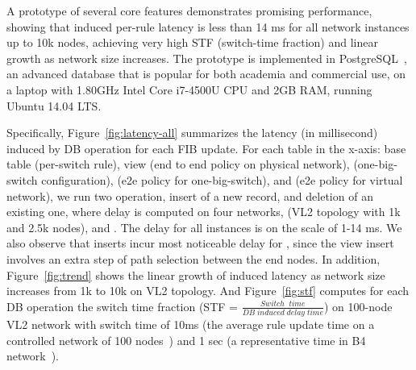 A prototype of several core features \TI demonstrates promising
performance, showing that \Sys induced per-rule latency is less than
14 ms for all network instances up to 10k nodes, achieving very high
STF (switch-time fraction) and linear growth as network size
increases. The prototype is implemented in PostgreSQL~\cite{postgres},
an advanced database that is popular for both academia and commercial
use, on a laptop with 1.80GHz Intel Core i7-4500U CPU and 2GB RAM,
running Ubuntu 14.04 LTS.

Specifically, Figure~\ref{fig:latency-all} summarizes the latency (in
millisecond) induced by DB operation for each FIB update.  For each
table in the x-axis: base table  (per-switch rule), view
 (end to end policy on physical network), 
(one-big-switch configuration),  (e2e policy for
one-big-switch), and  (e2e policy for virtual network), we
run two operation, insert of a new record, and deletion of an existing
one, where delay is computed on four networks,  (VL2
topology with 1k and 2.5k nodes), and . The
delay for all instances is on the scale of 1-14 ms. We also observe
that inserts incur most noticeable delay for
, since the  view insert involves an
extra step of path selection between the end nodes. In addition,
Figure~\ref{fig:trend} shows the linear growth of \Sys induced latency
as network size increases from 1k to 10k on VL2 topology.  And
Figure~\ref{fig:stf} computes for each DB operation the switch time
fraction (STF = $\frac{Switch\;\; time}{DB\; induced\; delay\; time}$)
on 100-node VL2 network with switch time of 10ms (the average rule
update time on a controlled network of 100 nodes~\cite{ffc}) and 1 sec
(a representative time in B4 network~\cite{b4}).




